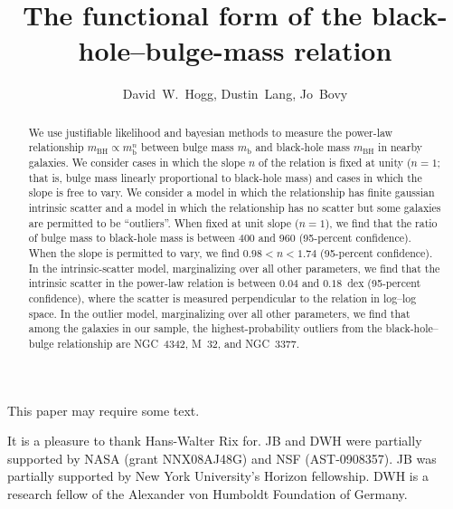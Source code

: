 \documentclass[12pt,preprint]{aastex}
\newcounter{address}
\newcommand{\mbulge}{m_{\mathrm{b}}}
\newcommand{\mbh}{m_{\mathrm{BH}}}
\newcommand{\slope}{n}
\begin{document}
\title{The functional form of the black-hole--bulge-mass relation}
\author{David~W.~Hogg\altaffilmark{\ref{CCPP},\ref{MPIA},\ref{email}},
        Dustin~Lang\altaffilmark{\ref{UofT},\ref{Princeton}},
        Jo~Bovy\altaffilmark{\ref{CCPP}}}

\begin{abstract}
We use justifiable likelihood and bayesian methods to measure the
power-law relationship $\mbh\propto\mbulge^\slope$ between bulge mass
$\mbulge$ and black-hole mass $\mbh$ in nearby galaxies.  We consider
cases in which the slope $\slope$ of the relation is fixed at unity
($\slope=1$; that is, bulge mass linearly proportional to black-hole
mass) and cases in which the slope is free to vary.  We consider a
model in which the relationship has finite gaussian intrinsic scatter
and a model in which the relationship has no scatter but some galaxies
are permitted to be ``outliers''.  When fixed at unit slope
($\slope=1$), we find that the ratio of bulge mass to black-hole mass
is between 400 and 960 (95-percent confidence).  When the slope is
permitted to vary, we find $0.98<\slope<1.74$ (95-percent confidence).
In the intrinsic-scatter model, marginalizing over all other
parameters, we find that the intrinsic scatter in the power-law
relation is between $0.04$ and $0.18$~dex (95-percent confidence),
where the scatter is measured perpendicular to the relation in
log--log space.  In the outlier model, marginalizing over all other
parameters, we find that among the galaxies in our sample, the
highest-probability outliers from the black-hole--bulge relationship
are NGC~4342, M~32, and NGC~3377.
\end{abstract}

This paper may require some text.

\acknowledgments It is a pleasure to thank Hans-Walter Rix for. JB and
DWH were partially supported by NASA (grant NNX08AJ48G) and NSF
(AST-0908357).  JB was partially supported by New York University's
Horizon fellowship.  DWH is a research fellow of the Alexander von
Humboldt Foundation of Germany.
\end{document}
